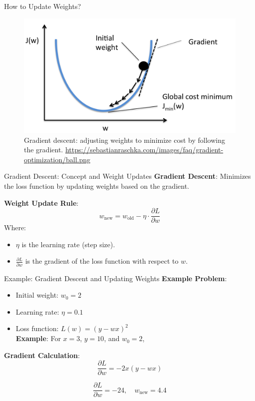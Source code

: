 \documentclass[serif, aspectratio=169]{beamer}
\begin{document}
\begin{frame}{How to Update Weights?}

    \begin{center}
            \begin{figure}[h]
            \centering
            \includegraphics[height=.6\textheight]{pic/ball.png}
            \caption{\footnotesize Gradient descent: adjusting weights to minimize cost by following the gradient. \url{https://sebastianraschka.com/images/faq/gradient-optimization/ball.png}}
        \end{figure}
    \end{center}
\end{frame}


\begin{frame}{Gradient Descent: Concept and Weight Updates}
    \textbf{Gradient Descent}: Minimizes the loss function by updating weights based on the gradient.

    \textbf{Weight Update Rule}:
    \[
    w_{\text{new}} = w_{\text{old}} - \eta \cdot \frac{\partial L}{\partial w}
    \]
    Where:
    \begin{itemize}
        \item \( \eta \) is the learning rate (step size).
        \item \( \frac{\partial L}{\partial w} \) is the gradient of the loss function with respect to \( w \).
    \end{itemize}
\end{frame}

\begin{frame}{Example: Gradient Descent and Updating Weights}
    \textbf{Example Problem}:
    \begin{itemize}
        \item Initial weight: \( w_0 = 2 \)
        \item Learning rate: \( \eta = 0.1 \)
        \item Loss function: \( L(w) = (y - wx)^2 \) \\
        \textbf{Example}: For \( x = 3 \), \( y = 10 \), and \( w_0 = 2 \),

    \end{itemize}
    
    \textbf{Gradient Calculation}:
    \[
    \frac{\partial L}{\partial w} = -2x(y - wx)
    \]
    
    \[
    \frac{\partial L}{\partial w} = -24, \quad w_{\text{new}} = 4.4
    \]
\end{frame}
\end{document}
